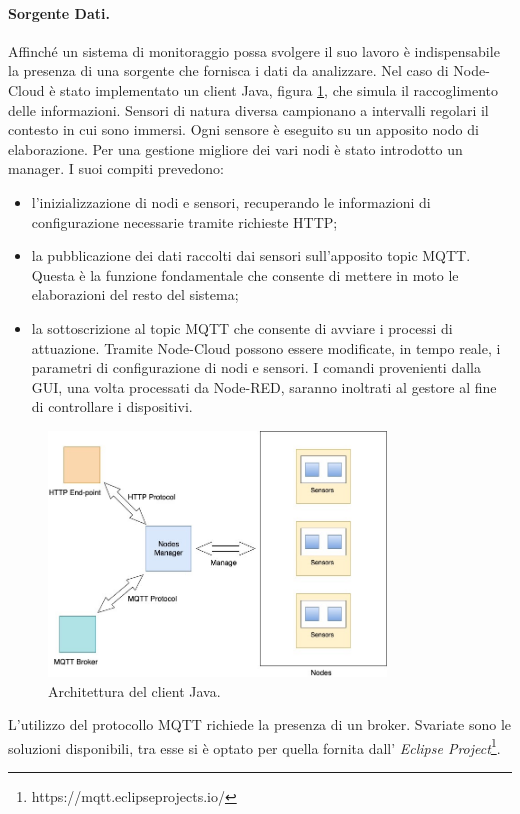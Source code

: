 \documentclass{article}
\begin{document}
\paragraph{Sorgente Dati.}
Affinché un sistema di monitoraggio possa svolgere il suo lavoro è indispensabile la presenza di una sorgente che fornisca i dati da analizzare. Nel caso di Node-Cloud è stato implementato un client Java, figura \ref{fig:java-client-architecture}, che simula il raccoglimento delle informazioni. Sensori di natura diversa campionano a intervalli regolari il contesto in cui sono immersi. Ogni sensore è eseguito su un apposito nodo di elaborazione. Per una gestione migliore dei vari nodi è stato introdotto un manager. I suoi compiti prevedono:
\begin{itemize}
    \item l’inizializzazione di nodi e sensori, recuperando le informazioni di configurazione necessarie tramite richieste HTTP;
    \item la pubblicazione dei dati raccolti dai sensori sull’apposito topic MQTT. Questa è la funzione fondamentale che consente di mettere in moto le elaborazioni del resto del sistema;
    \item la sottoscrizione al topic MQTT che consente di avviare i processi di attuazione. Tramite Node-Cloud possono essere modificate, in tempo reale, i parametri di configurazione di nodi e sensori. I comandi provenienti dalla GUI, una volta processati da Node-RED, saranno inoltrati al gestore al fine di controllare i dispositivi.
\end{itemize}
\begin{figure}[htb]
    \centering
    \includegraphics[width=0.80\textwidth]{java client.jpeg}
    \caption{Architettura del client Java.}
    \label{fig:java-client-architecture}
\end{figure}
L’utilizzo del protocollo MQTT richiede la presenza di un broker. Svariate sono le soluzioni disponibili, tra esse si è optato per quella fornita dall’ \emph{Eclipse Project}\footnote{https://mqtt.eclipseprojects.io/}.
\end{document}

